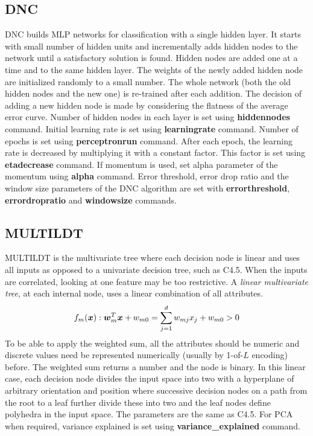\documentclass[a4paper,12pt]{book}
\def\bw{{\mbox{\boldmath $w$}}}
\def\bx{{\mbox{\boldmath $x$}}}
\def\bw{{\mbox{\boldmath $w$}}}
\def\bx{{\mbox{\boldmath $x$}}}
\begin{document}
\subsection{DNC}
DNC \cite{ash89dynamic} builds MLP networks for classification with a single hidden layer. It starts with small number of hidden units and incrementally adds hidden nodes to the network until a satisfactory solution is found. Hidden nodes are added one at a time and to the same hidden layer. The weights of the newly added hidden node are initialized randomly to a small number. The whole network (both the old hidden nodes and the new one) is re-trained after each addition. The decision of adding a new hidden node is made by considering the flatness of the average error curve. Number of hidden nodes in each layer is set using {\bf hiddennodes} command. Initial learning rate is set using {\bf learningrate} command. Number of epochs is set using {\bf perceptronrun} command. After each epoch, the learning rate is decreased by multiplying it with a constant factor. This factor is set using {\bf etadecrease} command. If momentum is used, set alpha parameter of the momentum using {\bf alpha} command. Error threshold, error drop ratio and the window size parameters of the DNC algorithm are set with {\bf errorthreshold}, {\bf errordropratio} and {\bf windowsize} commands.

\subsection{MULTILDT}
MULTILDT is the multivariate tree where each decision node is linear \cite{yildiz00} and uses all inputs as opposed to a univariate decision tree, such as C4.5. When the inputs are correlated, looking at one feature may be too restrictive. A {\em linear multivariate tree}, at each internal node, uses a linear combination of all attributes. 
\begin{equation}
f_m(\bx): \bw_m^T \bx + w_{m0} = \sum_{j=1}^d w_{mj} x_j + w_{m0} > 0
\end{equation}
To be able to apply the weighted sum, all the attributes should be numeric and discrete values need be represented numerically (usually by 1-of-$L$ encoding) before. The weighted sum returns a number and the node is binary. In this linear case, each decision node divides the input space into two with a hyperplane of arbitrary orientation and position where successive decision nodes on a path from the root to a leaf further divide these into two and the leaf nodes define polyhedra in the input space. The parameters are the same as C4.5. For PCA when required, variance explained is set using {\bf variance\_explained} command.
\end{document}
